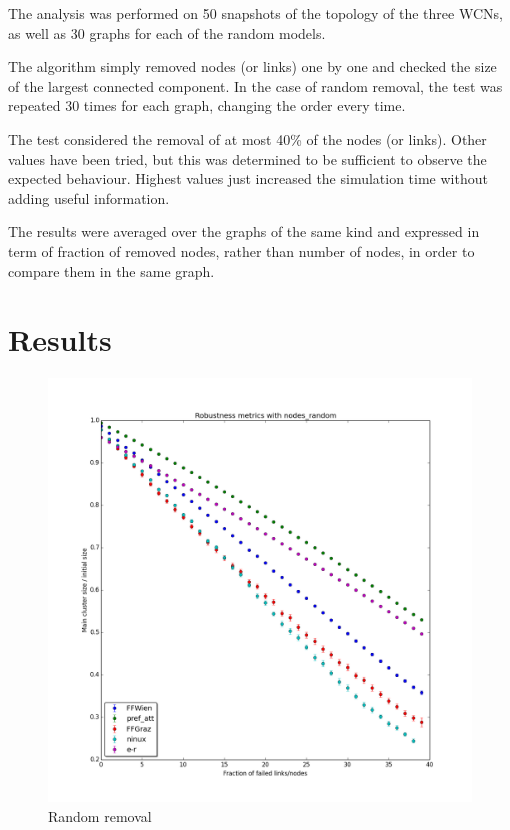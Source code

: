 \documentclass[oneside,openany]{memoir}
\begin{document}
The analysis was performed on 50 snapshots of the topology of the three
WCNs, as well as 30 graphs for each of the random models.

The algorithm simply removed nodes (or links) one by one and checked the
size of the largest connected component. In the case of random removal,
the test was repeated 30 times for each graph, changing the order every
time.

The test considered the removal of at most 40\% of the nodes (or links).
Other values have been tried, but this was determined to be sufficient
to observe the expected behaviour. Highest values just increased the
simulation time without adding useful information.

The results were averaged over the graphs of the same kind and expressed
in term of fraction of removed nodes, rather than number of nodes, in
order to compare them in the same graph.

\section{Results}\label{results}

\begin{figure}[htbp]
\centering
\includegraphics{./synthetic_topologies/results/20140618-1529/nodes_random_robustness.png}
\caption{Random removal}
\end{figure}
\end{document}

